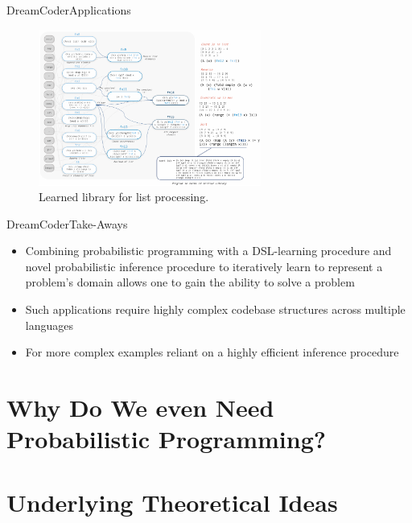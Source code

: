 \documentclass[AERbeamer%
              ,optEnglish%
              ,optBiber%
              ,optBibstyleAlphabetic%
              ,optBeamerClassicFormat%
              ]{AERlatex}%
\begin{document}
\begin{frame}[c]{DreamCoder}{Applications}
    \centering
    \begin{figure}
        \centering
        \includegraphics[width=0.65\textwidth]{DreamCoderApplication4.png}
        \caption{Learned library for list processing.}
    \end{figure}
\end{frame}


\begin{frame}[c]{DreamCoder}{Take-Aways}
    \centering
    \begin{itemize}
        \item Combining probabilistic programming with a DSL-learning procedure and novel probabilistic inference procedure
              to iteratively learn to represent a problem's domain allows one to gain the ability to solve a problem
        \item Such applications require highly complex codebase structures across multiple languages
        \item For more complex examples reliant on a highly efficient inference procedure
    \end{itemize}
\end{frame}




\section{Why Do We even Need Probabilistic Programming?}





\section{Underlying Theoretical Ideas}
\end{document}
